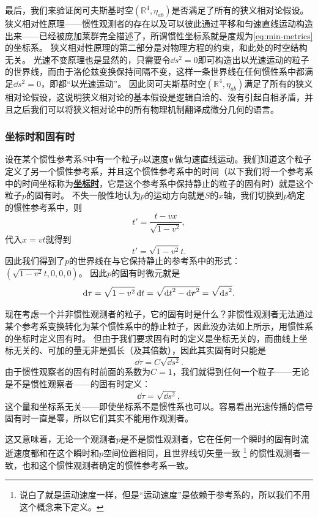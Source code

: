 \documentclass[hyperref, UTF8, a4paper]{ctexart}
\newcommand*{\concept}[1]{\underline{\textbf{#1}}}
\begin{document}
最后，我们来验证闵可夫斯基时空$(\mathbb{R}^4, \eta_{ab})$是否满足了所有的狭义相对论假设。
狭义相对性原理——惯性观测者的存在以及可以彼此通过平移和匀速直线运动构造出来——已经被庞加莱群完全描述了，所谓惯性坐标系就是度规为\eqref{eq:min-metrics}的坐标系。
狭义相对性原理的第二部分是对物理方程的约束，和此处的时空结构无关。
光速不变原理也是显然的，只需要令$\dd{s}^2=0$即可构造出以光速运动的粒子的世界线，而由于洛伦兹变换保持间隔不变，这样一条世界线在任何惯性系中都满足$\dd{s}^2=0$，即都“以光速运动”。
因此闵可夫斯基时空$(\mathbb{R}^4, \eta_{ab})$满足了所有的狭义相对论假设，这说明狭义相对论的基本假设是逻辑自洽的、没有引起自相矛盾，并且之后我们可以将狭义相对论中的所有物理机制翻译成微分几何的语言。

\subsubsection{坐标时和固有时}

设在某个惯性参考系$S$中有一个粒子$p$以速度$\vb*{v}$做匀速直线运动。我们知道这个粒子定义了另一个惯性参考系，并且这个惯性参考系中的时间（以下我们将一个参考系中的时间坐标称为\concept{坐标时}，它是这个参考系中保持静止的粒子的固有时）就是这个粒子$p$的固有时。
不失一般性地认为$p$的运动方向就是$S$的$x$轴，我们切换到$p$确定的惯性参考系中，则
\[
    t' = \frac{t - vx}{\sqrt{1 - v^2}},
\]
代入$x = vt$就得到
\[
    t' = \sqrt{1 - v^2} t.
\]
因此我们得到了$p$的世界线在与它保持静止的参考系中的形式：$(\sqrt{1 - v^2}t, 0, 0, 0)$。
因此$p$的固有时微元就是
\begin{equation}
    \dd{\tau} = \sqrt{1 - v^2} \dd{t} = \sqrt{\dd{t}^2 - \dd{\vb*{r}}^2} = \sqrt{\dd{s}^2}.
\end{equation}

现在考虑一个并非惯性观测者的粒子，它的固有时是什么？非惯性观测者无法通过某个参考系变换转化为某个惯性系中的静止粒子，因此没办法如上所示，用惯性系的坐标时定义固有时。
但由于我们要求固有时的定义是坐标无关的，而曲线上坐标无关的、可加的量无非是弧长（及其倍数），因此其实固有时只能是
\[
    \dd{\tau} = C \sqrt{\dd{s}^2}.
\]
由于惯性观察者的固有时前面的系数为$C=1$，我们就得到任何一个粒子——无论是不是惯性观察者——的固有时定义：
\begin{equation}
    \dd{\tau} = \sqrt{\dd{s}^2},
\end{equation}
这个量和坐标系无关——即使坐标系不是惯性系也可以。容易看出光速传播的信号固有时一直是零，所以它们其实不能用作观测者。

这又意味着，无论一个观测者$p$是不是惯性观测者，它在任何一个瞬时的固有时流逝速度都和在这个瞬时和$p$空间位置相同，且世界线切矢量一致%
\footnote{
    说白了就是运动速度一样，但是“运动速度”是依赖于参考系的，所以我们不用这个概念来下定义。
}%
的惯性观测者一致，也和这个惯性观测者确定的惯性参考系一致。
\end{document}
